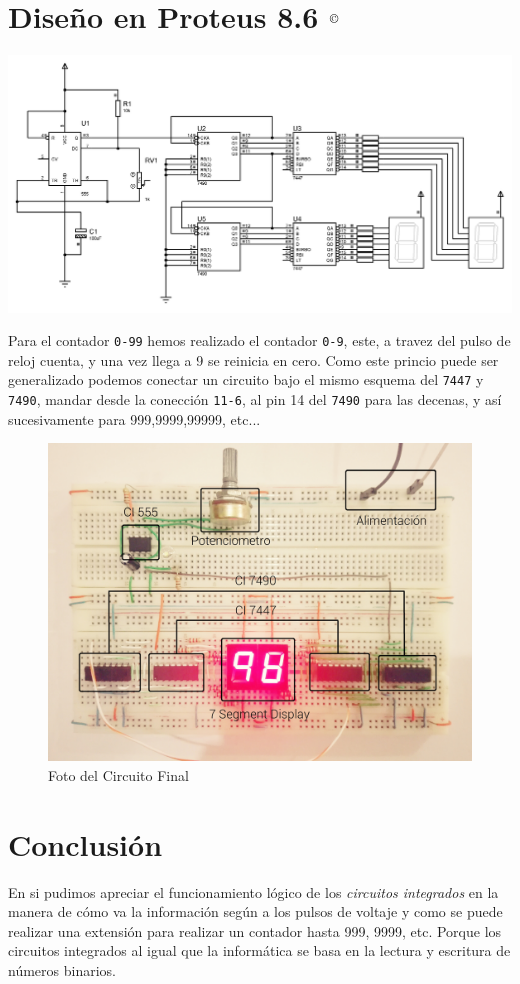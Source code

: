\documentclass[10pt,letterpaper]{article}
\begin{document}
\section{Diseño en Proteus 8.6 $^\text{{\small \textcopyright}}$ }
\begin{center}
\includegraphics[scale=0.45]{Proteus-Circuito}
\end{center}
Para el contador \texttt{0-99} hemos realizado el contador \texttt{0-9}, este, a travez del pulso de reloj cuenta, y una vez llega a 9 se reinicia en cero. Como este princio puede ser generalizado podemos conectar un circuito bajo el mismo esquema del \texttt{7447} y \texttt{7490}, mandar desde la conección \texttt{11-6}, al pin 14 del \texttt{7490} para las decenas, y así sucesivamente para 999,9999,99999, etc...
\begin{figure}[!h]
\centering
\includegraphics[scale=0.08]{Circuito-Real2}
\caption{Foto del Circuito Final}
\end{figure}
\pagebreak
\section*{Conclusión}
En si pudimos apreciar el funcionamiento lógico de los \textit{circuitos integrados} en la manera de cómo va la información según a los pulsos de voltaje y como se puede realizar una extensión para realizar un contador hasta 999, 9999, etc. Porque los circuitos integrados al igual que la informática se basa en la lectura y escritura de números binarios.
\end{document}
